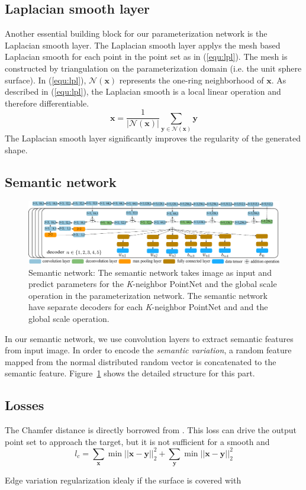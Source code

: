 \subsection{Laplacian smooth layer}
Another essential building block for our parameterization network is the Laplacian smooth layer. The Laplacian smooth layer applys the mesh based Laplacian smooth for each point in the point set as in (\ref{equ:lpl}). The mesh is constructed by triangulation on the parameterization domain (i.e. the unit sphere surface). In (\ref{equ:lpl}), $\mathcal{N}(\mathbf{x})$ represents the one-ring neighborhood of $\mathbf{x}$. As described in (\ref{equ:lpl}), the Laplacian smooth is a local linear operation and therefore differentiable.
\begin{equation}
\mathbf{x} = \frac{1}{|\mathcal{N}(\mathbf{x})|}\sum_{\mathbf{y}\in\mathcal{N}(\mathbf{x})}\mathbf{y}
\label{equ:lpl}
\end{equation}
The Laplacian smooth layer significantly improves the regularity of the generated shape.
\subsection{Semantic network}
\label{subsec:semnet}
\begin{figure}[htbp]
	\centering
	\includegraphics[width=\linewidth]{img/net/semnet}
	\caption{Semantic network: The semantic network takes image as input and predict parameters for the \textit{K}-neighbor PointNet and the global scale operation in the parameterization network. The semantic network have separate decoders for each \textit{K}-neighbor PointNet and and the global scale operation.}
	\label{fig:conv}
\end{figure}
In our semantic network, we use convolution layers to extract semantic features from input image. In order to encode the \textit{semantic variation}, a random feature mapped from the normal distributed random vector is concatenated to the semantic feature.  Figure~\ref{fig:conv} shows the detailed structure for this part. 
\subsection{Losses}
 The Chamfer distance is directly borrowed from \citep{PSGN}. This loss can drive the output point set to approach the target, but it is not sufficient for a smooth and  
\begin{equation}
l_c = \sum_\mathbf{x} \min||\mathbf{x}-\mathbf{y}||_2^2+\sum_\mathbf{y} \min||\mathbf{x}-\mathbf{y}||_2^2
\end{equation}

Edge variation regularization 
idealy if the surface is covered with 

